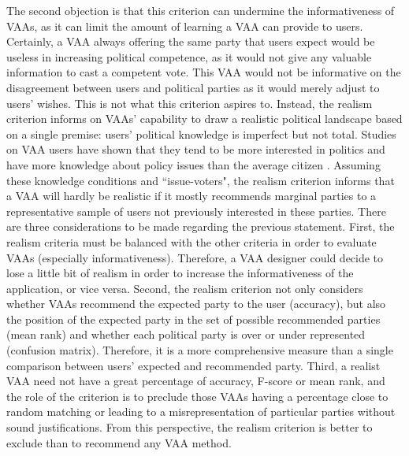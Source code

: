 \documentclass{scrartcl}
\begin{document}
The second objection is that this criterion can undermine the informativeness of VAAs, as it can limit the amount of learning a VAA can provide to users. Certainly, a VAA always offering the same party that users expect would be useless in increasing political competence, as it would not give any valuable information to cast a competent vote. This VAA would not be informative on the disagreement between users and political parties as it would merely adjust to users' wishes. This is not what this criterion aspires to. Instead, the realism criterion informs on VAAs' capability to draw a realistic political landscape based on a single premise: users’ political knowledge is imperfect but not total. Studies on VAA users have shown that they tend to be more interested in politics and have more knowledge about policy issues than the average citizen \cite{cedroni2010voting}. Assuming these knowledge conditions and ``issue-voters", the realism criterion informs that a VAA will hardly be realistic if it mostly recommends marginal parties to a representative sample of users not previously interested in these parties. There are three considerations to be made regarding the previous statement. First, the realism criteria must be balanced with the other criteria in order to evaluate VAAs (especially informativeness). Therefore, a VAA designer could decide to lose a little bit of realism in order to increase the informativeness of the application, or vice versa. Second, the realism criterion not only considers whether VAAs recommend the expected party to the user (accuracy), but also the position of the expected party in the set of possible recommended parties (mean rank) and whether each political party is over or under represented (confusion matrix). Therefore, it is a more comprehensive measure than a single comparison between users' expected and recommended party. Third, a realist VAA need not have a great percentage of accuracy, F-score or mean rank, and the role of the criterion is to preclude those VAAs having a percentage close to random matching or leading to a misrepresentation of particular parties without sound justifications. From this perspective, the realism criterion is better to exclude than to recommend any VAA method.
\\
\end{document}
